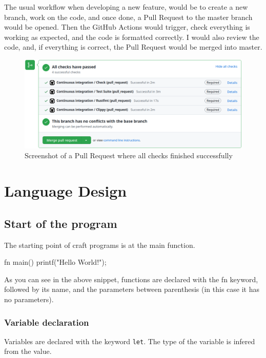 ﻿\documentclass[10pt,a4paper,twocolumn,twoside]{article}
\begin{document}
The usual workflow when developing a new feature, would be to create a new
branch, work on the code, and once done, a Pull Request to the master branch
would be opened. Then the GitHub Actions would trigger, check everything is 
working as expected, and the code is formatted correctly. I would also review 
the code, and, if everything is correct, the Pull Request would be merged into
master.

\begin{figure}[ht]
\centering
\captionsetup{justification=centering,margin=1cm}
\includegraphics[width=\linewidth]{ci-pr-success}
\caption{Screenshot of a Pull Request where all checks finished successfully}
\end{figure}

\section{Language Design}

\subsection{Start of the program}
The starting point of craft programs is at the main function.

\begin{code}
fn main() {
    printf("Hello World!\n");
}
\end{code}

As you can see in the above snippet, functions are declared with the fn keyword,
followed by its name, and  the parameters between parenthesis (in this case it 
has no parameters).

\subsubsection{Variable declaration}
Variables are declared with the keyword \texttt{let}. The type of the variable
is infered from the value.
\end{document}
